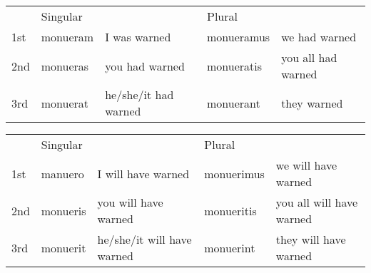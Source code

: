 \begin{center}  
  \begin{tabular}{lllll}
    \centering
    & Singular & & Plural &  \\
    1st & monueram & I was warned& monueramus & we had warned\\
    2nd & monueras & you had warned& monueratis & you all had warned\\ 
    3rd & monuerat & he/she/it had warned& monuerant & they warned\\
  \end{tabular}
\end{center}


\begin{center}  
  \begin{tabular}{lllll}
    \centering
    & Singular & & Plural &  \\
    1st & manuero & I will have warned& monuerimus & we will have warned\\
    2nd & monueris & you will have warned& monueritis & you all will have warned\\ 
    3rd & monuerit & he/she/it will have warned& monuerint & they will have warned\\
  \end{tabular}
\end{center}

